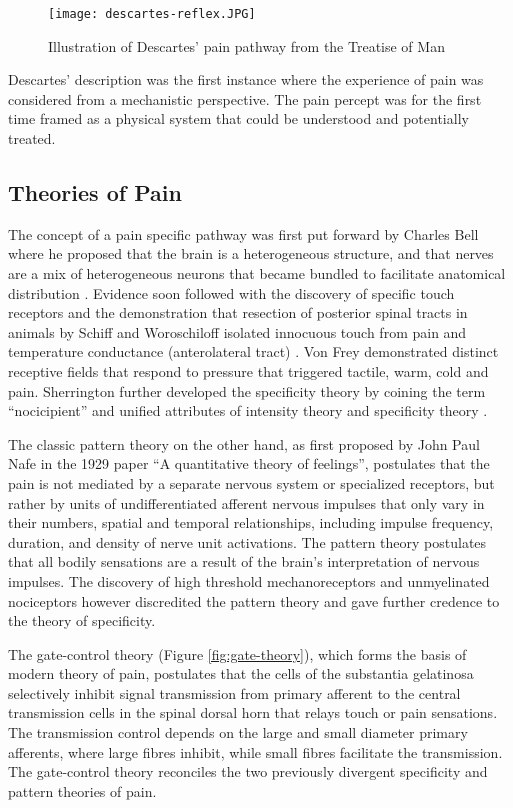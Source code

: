 \begin{figure}[ht]
\texttt{[image: descartes-reflex.JPG]}
\centering
\caption{Illustration of Descartes' pain pathway from the Treatise of Man \protect\cite{descartes-wikipedia}}
\label{fig:descarte}
\end{figure}

Descartes' description was the first instance where the experience of pain was considered from a mechanistic perspective. The pain percept was for the first time framed as a physical system that could be understood and potentially treated.

\subsection{Theories of Pain}
 
The concept of a pain specific pathway was first put forward by Charles Bell where he proposed that the brain is a heterogeneous structure, and that nerves are a mix of heterogeneous neurons that became bundled to facilitate anatomical distribution \cite{Bell1868}. Evidence soon followed with the discovery of specific touch receptors and the demonstration that resection of posterior spinal tracts in animals by Schiff and Woroschiloff isolated innocuous touch from pain and temperature conductance (anterolateral tract) \cite{Dallenbach1939}. Von Frey demonstrated distinct receptive fields that respond to pressure that triggered tactile, warm, cold and pain. Sherrington further developed the specificity theory by coining the term “nocicipient” and unified attributes of intensity theory and specificity theory \cite{Casey1982}.

The classic pattern theory on the other hand, as first proposed by John Paul Nafe in the 1929 paper “A quantitative theory of feelings”\cite{Nafe1929}, postulates that the pain is not mediated by a separate nervous system or specialized receptors, but rather by units of undifferentiated afferent nervous impulses that only vary in their numbers, spatial and temporal relationships, including impulse frequency, duration, and density of nerve unit activations. The pattern theory postulates that all bodily sensations are a result of the brain's interpretation of nervous impulses. The discovery of high threshold mechanoreceptors and unmyelinated nociceptors however discredited the pattern theory and gave further credence to the theory of specificity. 

The gate-control theory \cite{Melzack1965a} (Figure \ref{fig:gate-theory}), which forms the basis of modern theory of pain, postulates that the cells of the substantia gelatinosa selectively inhibit signal transmission from primary afferent to the central transmission cells in the spinal dorsal horn that relays touch or pain sensations. The transmission control depends on the large and small diameter primary afferents, where large fibres inhibit, while small fibres facilitate the transmission. The gate-control theory reconciles the two previously divergent specificity and pattern theories of pain.

